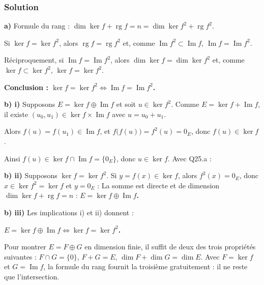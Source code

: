 \documentclass[11pt,a4paper]{article}
\newcommand{\equationajustee}[1]{%
  \sbox{\boiteequation}{$\displaystyle #1$}%
  \ifdim\wd\boiteequation>\linewidth
    \[\resizebox{\linewidth}{!}{\usebox{\boiteequation}}\]%
  \else
    \[#1\]%
  \fi}
\begin{document}
\hypertarget{solution-25}{%
\subsubsection{Solution}\label{solution-25}}

\textbf{a)} Formule du rang : \(\dim\ker f+\operatorname{rg}f=n=\dim\ker f^2+\operatorname{rg}f^2\).

Si \(\ker f=\ker f^2\), alors \(\operatorname{rg}f=\operatorname{rg}f^2\) et, comme \(\operatorname{Im}f^2\subset\operatorname{Im}f\), \(\operatorname{Im}f=\operatorname{Im}f^2\).

Réciproquement, si \(\operatorname{Im}f=\operatorname{Im}f^2\), alors \(\dim\ker f=\dim\ker f^2\) et, comme \(\ker f\subset\ker f^2\), \(\ker f=\ker f^2\).

\textbf{Conclusion : \(\ker f=\ker f^2\iff\operatorname{Im}f=\operatorname{Im}f^2\).}

\textbf{b) i)} Supposons \(E=\ker f\oplus\operatorname{Im}f\) et soit \(u\in\ker f^2\). Comme \(E=\ker f+\operatorname{Im}f\), il existe \((u_0,u_1)\in\ker f\times\operatorname{Im}f\) avec \(u=u_0+u_1\).

Alors \(f(u)=f(u_1)\in\operatorname{Im}f\), et \(f\big(f(u)\big)=f^2(u)=0_E\), donc \(f(u)\in\ker f\).

Ainsi \(f(u)\in\ker f\cap\operatorname{Im}f=\{0_E\}\), donc \textbf{\(u\in\ker f\)}. Avec Q25.a :
\equationajustee{\boxed{\ker f=\ker f^2}.}

\textbf{b) ii)} Supposons \(\ker f=\ker f^2\). Si \(y=f(x)\in\ker f\), alors \(f^2(x)=0_E\), donc \(x\in\ker f^2=\ker f\) et \(y=0_E\) :
\equationajustee{\boxed{\ker f\cap\operatorname{Im}f=\{0_E\}}.}
La somme est directe et de dimension \(\dim\ker f+\operatorname{rg}f=n\) : \textbf{\(E=\ker f\oplus\operatorname{Im}f\).}

\textbf{b) iii)} Les implications i) et ii) donnent :

\textbf{\(E=\ker f\oplus\operatorname{Im}f\iff\ker f=\ker f^2\).}

\begin{methode}

Pour montrer \(E=F\oplus G\) en dimension finie, il suffit de deux des trois propriétés suivantes : \(F\cap G=\{0\}\), \(F+G=E\), \(\dim F+\dim G=\dim E\). Avec \(F=\ker f\) et \(G=\operatorname{Im}f\), la formule du rang fournit la troisième gratuitement : il ne reste que l'intersection.

\end{methode}
\end{document}
